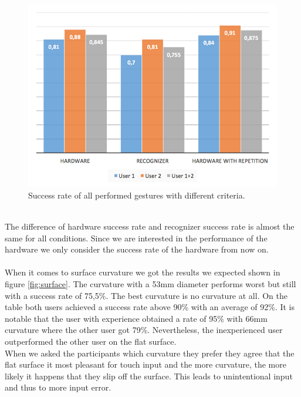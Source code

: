 \begin{figure}
\includegraphics[scale=0.35]{images/overallRecognition.jpg}
\caption{Success rate of all performed gestures with different criteria.}
\label{fig:overallRecognition}
\end{figure}
\\
The difference of hardware success rate and recognizer success rate is almost the same for all conditions. Since we are interested in the performance of the hardware we only consider the success rate of the hardware from now on. \\ \\
When it comes to surface curvature we got the results we expected shown in figure \ref{fig:surface}. The curvature with a 53mm diameter performs worst but still with a success rate of 75,5\%. The best curvature is no curvature at all. On the table both users achieved a success rate above 90\% with an average of 92\%. It is notable that the user with experience obtained a rate of 95\% with 66mm curvature where the other user got 79\%. Nevertheless, the inexperienced user outperformed the other user on the flat surface. 
\\
When we asked the participants which curvature they prefer they agree that the flat surface it most pleasant for touch input and the more curvature, the more likely it happens that they slip off the surface. This leads to unintentional input and thus to more input error. 
